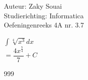 \documentclass[a4paper]{article}
\begin{document}
  
\noindent \large Auteur: Zaky Souai \\
\noindent \large Studierichting:  Informatica\\
\noindent \large Oefeningenreeks 4A nr. 3.7\\

\bigskip

\normalsize

$\displaystyle\int \sqrt[4]{x^3} dx$ \\

$= \dfrac{4x^{\tfrac{7}{4}}}{7} + C$ \\

\begin{thebibliography}{999}
\end{thebibliography}
\end{document}
